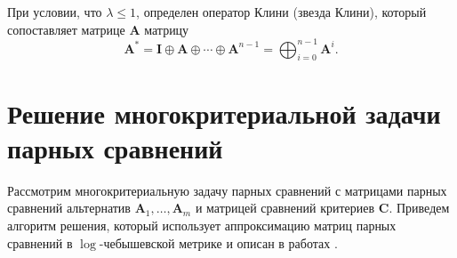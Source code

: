 \documentclass[specialist,
substylefile = spbu.rtx,
               subf,href,colorlinks=true, 12pt]{disser}
\begin{document}
    При условии, что $\lambda\leq1$, определен оператор Клини (звезда Клини), который сопоставляет матрице $\bm{A}$ матрицу
    \begin{equation*}
    \bm{A}^{\ast}
    =
    \bm{I}\oplus\bm{A}\oplus\cdots\oplus\bm{A}^{n-1}
    =
    \bigoplus_{i=0}^{n-1}\bm{A}^{i}.
    \end{equation*}

    \chapter{Решение многокритериальной задачи парных сравнений}

    Рассмотрим многокритериальную задачу парных сравнений с матрицами парных сравнений альтернатив $\bm{A}_{1},\ldots,\bm{A}_{m}$ и матрицей сравнений критериев $\bm{C}$. Приведем алгоритм решения, который использует аппроксимацию матриц парных сравнений в $\log$-че\-бы\-шевской метрике и описан в работах \cite{Krivulin2019Metody,Krivulin2019Tropical,Krivulin2022Using}. 
\end{document}
